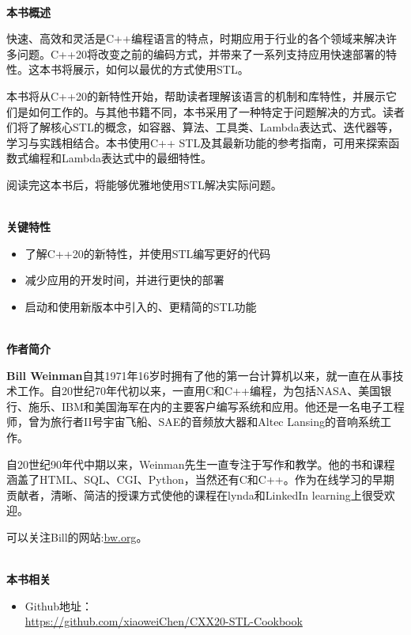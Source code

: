 \documentclass[11pt,a4paper,UTF8]{book}
\begin{document}
\begin{sloppypar}
	\hspace*{\fill} \\ %
	\noindent\textbf{本书概述}
	
	快速、高效和灵活是C++编程语言的特点，时期应用于行业的各个领域来解决许多问题。C++20将改变之前的编码方式，并带来了一系列支持应用快速部署的特性。这本书将展示，如何以最优的方式使用STL。
	
	本书将从C++20的新特性开始，帮助读者理解该语言的机制和库特性，并展示它们是如何工作的。与其他书籍不同，本书采用了一种特定于问题解决的方式。读者们将了解核心STL的概念，如容器、算法、工具类、Lambda表达式、迭代器等，学习与实践相结合。本书使用C++ STL及其最新功能的参考指南，可用来探索函数式编程和Lambda表达式中的最细特性。
	
	阅读完这本书后，将能够优雅地使用STL解决实际问题。
	
	\hspace*{\fill} \\ %
	\noindent\textbf{关键特性}
	\begin{itemize}
		\item 了解C++20的新特性，并使用STL编写更好的代码
		\item 减少应用的开发时间，并进行更快的部署
		\item 启动和使用新版本中引入的、更精简的STL功能
	\end{itemize}
	
	\hspace*{\fill} \\ %
	\noindent\textbf{作者简介}
	
	\textbf{Bill Weinman}自其1971年16岁时拥有了他的第一台计算机以来，就一直在从事技术工作。自20世纪70年代初以来，一直用C和C++编程，为包括NASA、美国银行、施乐、IBM和美国海军在内的主要客户编写系统和应用。他还是一名电子工程师，曾为旅行者II号宇宙飞船、SAE的音频放大器和Altec Lansing的音响系统工作。
	
	自20世纪90年代中期以来，Weinman先生一直专注于写作和教学。他的书和课程涵盖了HTML、SQL、CGI、Python，当然还有C和C++。作为在线学习的早期贡献者，清晰、简洁的授课方式使他的课程在lynda和LinkedIn learning上很受欢迎。
	
	可以关注Bill的网站:\url{bw.org}。
	
	\hspace*{\fill} \\ %
	\noindent\textbf{本书相关}
	\begin{itemize}
		\item Github地址：\\\url{https://github.com/xiaoweiChen/CXX20-STL-Cookbook}
	\end{itemize}
	\newpage
	

\end{sloppypar}
\end{document}
